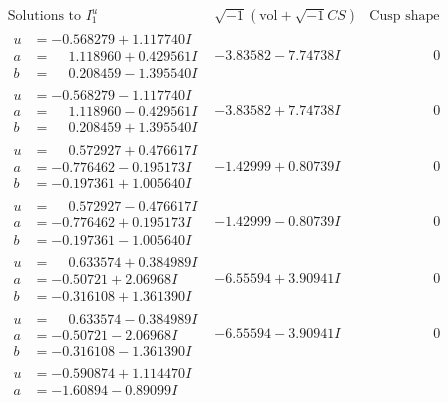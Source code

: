 \documentclass[1p]{elsarticle_modified}
\theoremstyle{definition}
\newcommand{\I}{\sqrt{-1}}
\begin{document}
$$\begin{array}{c|c|c}
\text{Solutions to }I^u_{1}& \I (\text{vol} + \sqrt{-1}CS) & \text{Cusp shape}\\
 \hline 
\begin{aligned}
u &= -0.568279 + 1.117740 I \\
a &= \phantom{-}1.118960 + 0.429561 I \\
b &= \phantom{-}0.208459 - 1.395540 I\end{aligned}
 & -3.83582 - 7.74738 I & \phantom{-0.000000 } 0 \\ \hline\begin{aligned}
u &= -0.568279 - 1.117740 I \\
a &= \phantom{-}1.118960 - 0.429561 I \\
b &= \phantom{-}0.208459 + 1.395540 I\end{aligned}
 & -3.83582 + 7.74738 I & \phantom{-0.000000 } 0 \\ \hline\begin{aligned}
u &= \phantom{-}0.572927 + 0.476617 I \\
a &= -0.776462 - 0.195173 I \\
b &= -0.197361 + 1.005640 I\end{aligned}
 & -1.42999 + 0.80739 I & \phantom{-0.000000 } 0 \\ \hline\begin{aligned}
u &= \phantom{-}0.572927 - 0.476617 I \\
a &= -0.776462 + 0.195173 I \\
b &= -0.197361 - 1.005640 I\end{aligned}
 & -1.42999 - 0.80739 I & \phantom{-0.000000 } 0 \\ \hline\begin{aligned}
u &= \phantom{-}0.633574 + 0.384989 I \\
a &= -0.50721 + 2.06968 I \\
b &= -0.316108 + 1.361390 I\end{aligned}
 & -6.55594 + 3.90941 I & \phantom{-0.000000 } 0 \\ \hline\begin{aligned}
u &= \phantom{-}0.633574 - 0.384989 I \\
a &= -0.50721 - 2.06968 I \\
b &= -0.316108 - 1.361390 I\end{aligned}
 & -6.55594 - 3.90941 I & \phantom{-0.000000 } 0 \\ \hline\begin{aligned}
u &= -0.590874 + 1.114470 I \\
a &= -1.60894 - 0.89099 I \\

\end{aligned}
\end{array}$$
\end{document}
